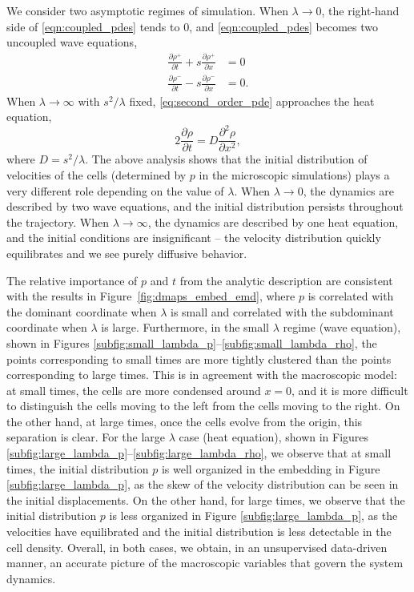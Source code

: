 We consider two asymptotic regimes of simulation.
%
When $\lambda \rightarrow 0$, the right-hand side of \eqref{eqn:coupled_pdes} tends to 0, and \eqref{eqn:coupled_pdes} becomes two uncoupled wave equations,
\begin{equation}
\begin{aligned}
\frac{\partial \rho^+}{\partial t} + s \frac{\partial \rho^+}{\partial x} & = 0 \\
\frac{\partial \rho^-}{\partial t} - s \frac{\partial \rho^-}{\partial x} & = 0.
\end{aligned}
\end{equation}
%
When $\lambda \rightarrow \infty$ with $s^2/\lambda$ fixed, \eqref{eq:second_order_pde} approaches the heat equation,
\begin{equation}
2 \frac{\partial \rho}{\partial t} = D \frac{\partial ^2 \rho}{\partial x^2},
\end{equation}
%
where $D=s^2/\lambda$.
%
The above analysis shows that the initial distribution of velocities of the cells (determined by $p$ in the microscopic simulations) plays a very different role depending on the value of $\lambda$.
%
When $\lambda \rightarrow 0$, the dynamics are described by two wave equations, and the initial distribution persists throughout the trajectory.
%
When $\lambda \rightarrow \infty$, the dynamics are described by one heat equation, and the initial conditions are insignificant -- the velocity distribution quickly equilibrates and we see purely diffusive behavior.

The relative importance of $p$ and $t$ from the analytic description are consistent with the results in Figure~\ref{fig:dmaps_embed_emd}, where $p$ is correlated with the dominant coordinate when $\lambda$ is small and correlated with the subdominant coordinate when $\lambda$ is large.
%
Furthermore, in the small $\lambda$ regime (wave equation), shown in Figures \ref{subfig:small_lambda_p}--\ref{subfig:small_lambda_rho}, the points corresponding to small times are more tightly clustered than the points corresponding to large times.
%
This is in agreement with the macroscopic model: at small times, the cells are more condensed around $x=0$, and it is more difficult to distinguish the cells moving to the left from the cells moving to the right.
%
On the other hand, at large times, once the cells evolve from the origin, this separation is clear.
%
For the large $\lambda$ case (heat equation), shown in Figures \ref{subfig:large_lambda_p}--\ref{subfig:large_lambda_rho}, we observe that at small times, the initial distribution $p$ is well organized in the embedding in Figure \ref{subfig:large_lambda_p}, as the skew of the velocity distribution can be seen in the initial displacements.
%
On the other hand, for large times, we observe that the initial distribution $p$ is less organized in Figure \ref{subfig:large_lambda_p}, as the velocities have equilibrated and the initial distribution is less detectable in the cell density.
%
Overall, in both cases, we obtain, in an unsupervised data-driven manner, an accurate picture of the macroscopic variables that govern the system dynamics.

